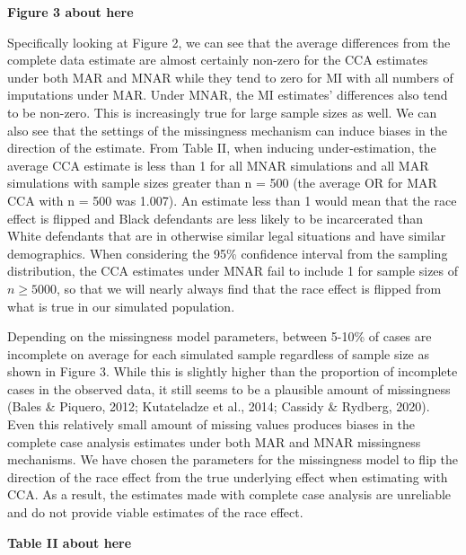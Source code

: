 \documentclass[titlepage]{article}
\begin{document}
\begin{center}
    \textbf{Figure 3 about here}
\end{center}

Specifically looking at Figure 2, we can see that the average differences from the complete data estimate are almost certainly non-zero for the CCA estimates under both MAR and MNAR while they tend to zero for MI with all numbers of imputations under MAR. Under MNAR, the MI estimates’ differences also tend to be non-zero. This is increasingly true for large sample sizes as well. We can also see that the settings of the missingness mechanism can induce biases in the direction of the estimate. From Table II, when inducing under-estimation, the average CCA estimate is less than 1 for all MNAR simulations and all MAR simulations with sample sizes greater than n = 500 (the average OR for MAR CCA with n = 500 was 1.007). An estimate less than 1 would mean that the race effect is flipped and Black defendants are less likely to be incarcerated than White defendants that are in otherwise similar legal situations and have similar demographics. When considering the 95\% confidence interval from the sampling distribution, the CCA estimates under MNAR fail to include 1 for sample sizes of \(n \geq 5000\), so that we will nearly always find that the race effect is flipped from what is true in our simulated population.

Depending on the missingness model parameters, between 5-10\% of cases are incomplete on average for each simulated sample regardless of sample size as shown in Figure 3. While this is slightly higher than the proportion of incomplete cases in the observed data, it still seems to be a plausible amount of missingness (Bales \& Piquero, 2012; Kutateladze et al., 2014; Cassidy \& Rydberg, 2020). Even this relatively small amount of missing values produces biases in the complete case analysis estimates under both MAR and MNAR missingness mechanisms. We have chosen the parameters for the missingness model to flip the direction of the race effect from the true underlying effect when estimating with CCA. As a result, the estimates made with complete case analysis are unreliable and do not provide viable estimates of the race effect.

\begin{center}
    \textbf{Table II about here}
\end{center}
\end{document}
